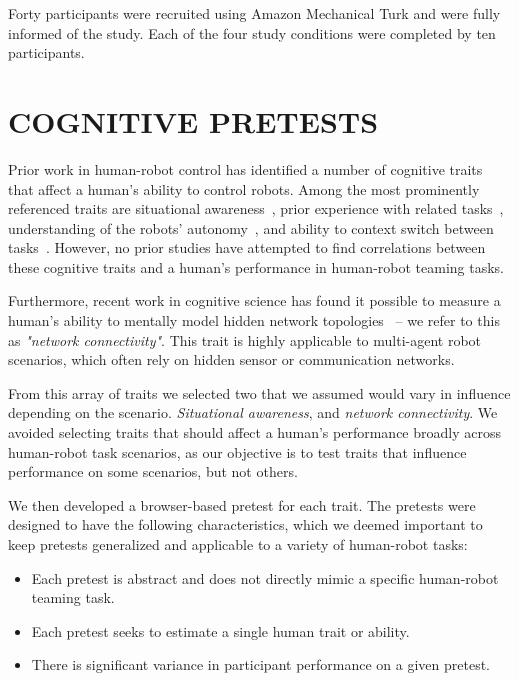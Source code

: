 \documentclass[letterpaper, 10 pt, conference]{ieeeconf}  %
\begin{document}
Forty participants were recruited using Amazon Mechanical Turk and were fully informed of the study. Each of the four study conditions were completed by ten participants.

\section{COGNITIVE PRETESTS}

Prior work in human-robot control has identified a number of cognitive traits that affect a human's ability to control robots. Among the most prominently referenced traits are situational awareness~\cite{chen2014human, ponda2010predictive, harriott2014biologically}, prior experience with related tasks~\cite{chen2014human, ponda2010predictive}, understanding of the robots' autonomy~\cite{chen2014human, harriott2014biologically}, and ability to context switch between tasks~\cite{chen2014human}. However, no prior studies have attempted to find correlations between these cognitive traits and a human's performance in human-robot teaming tasks.

Furthermore, recent work in cognitive science has found it possible to measure a human's ability to mentally model hidden network topologies~\cite{lynn2020abstract} -- we refer to this as \textit{"network connectivity"}. This trait is highly applicable to multi-agent robot scenarios, which often rely on hidden sensor or communication networks.

From this array of traits we selected two that we assumed would vary in influence depending on the scenario. \textit{Situational awareness}, and \textit{network connectivity}. We avoided selecting traits that should affect a human's performance broadly across human-robot task scenarios, as our objective is to test traits that influence performance on some scenarios, but not others.

We then developed a browser-based pretest for each trait. The pretests were designed to have the following characteristics, which we deemed important to keep pretests generalized and applicable to a variety of human-robot tasks:
\begin{itemize}
    \item Each pretest is abstract and does not directly mimic a specific human-robot teaming task. 
    \item Each pretest seeks to estimate a single human trait or ability.
    \item There is significant variance in participant performance on a given pretest.
\end{itemize}
\end{document}
